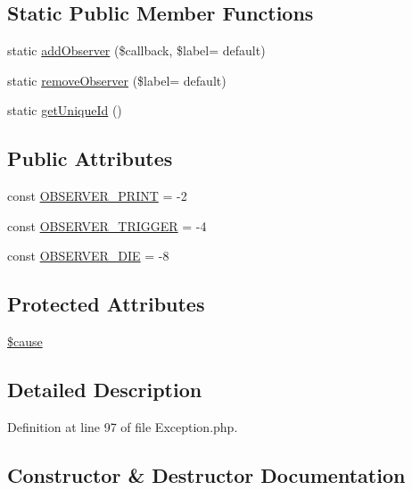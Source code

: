 \subsection*{Static Public Member Functions}
\begin{DoxyCompactItemize}
\item 
static \hyperlink{classPEAR__Exception_a02492e33d5af1e70e864d4269f6c5358}{add\+Observer} (\$callback, \$label= \textquotesingle{}default\textquotesingle{})
\item 
static \hyperlink{classPEAR__Exception_af5655bcf96398482199620196db0f8cb}{remove\+Observer} (\$label= \textquotesingle{}default\textquotesingle{})
\item 
static \hyperlink{classPEAR__Exception_af81b4e556fe7142e45ed9117b8cfb044}{get\+Unique\+Id} ()
\end{DoxyCompactItemize}
\subsection*{Public Attributes}
\begin{DoxyCompactItemize}
\item 
const \hyperlink{classPEAR__Exception_afaa71d35f3fab453da2cef325b210423}{O\+B\+S\+E\+R\+V\+E\+R\+\_\+\+P\+R\+I\+N\+T} = -\/2
\item 
const \hyperlink{classPEAR__Exception_a0bf6d43a80c7f3bc2c7cfae062ff4477}{O\+B\+S\+E\+R\+V\+E\+R\+\_\+\+T\+R\+I\+G\+G\+E\+R} = -\/4
\item 
const \hyperlink{classPEAR__Exception_ad3ee7214450c1e14de99dbde12b8a60c}{O\+B\+S\+E\+R\+V\+E\+R\+\_\+\+D\+I\+E} = -\/8
\end{DoxyCompactItemize}
\subsection*{Protected Attributes}
\begin{DoxyCompactItemize}
\item 
\hyperlink{classPEAR__Exception_a7570906af734c282bcde649449bdbfdb}{\$cause}
\end{DoxyCompactItemize}


\subsection{Detailed Description}


Definition at line 97 of file Exception.\+php.



\subsection{Constructor \& Destructor Documentation}
\hypertarget{classPEAR__Exception_a7cecb146f11821bcd31ef8317c9a2ce9}{}
